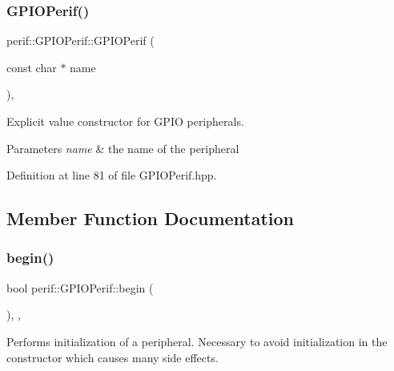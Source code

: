 \subsubsection{\texorpdfstring{GPIOPerif()}{GPIOPerif()}}
{\footnotesize\ttfamily perif\+::\+G\+P\+I\+O\+Perif\+::\+G\+P\+I\+O\+Perif (\begin{DoxyParamCaption}\item[{const char $\ast$}]{name }\end{DoxyParamCaption})\hspace{0.3cm}{\ttfamily [inline]}, {\ttfamily [explicit]}}

Explicit value constructor for G\+P\+IO peripherals.


\begin{DoxyParams}{Parameters}
{\em name} & the name of the peripheral \\
\hline
\end{DoxyParams}


Definition at line 81 of file G\+P\+I\+O\+Perif.\+hpp.


\begin{DoxyCode}{0}

\end{DoxyCode}


\subsection{Member Function Documentation}
\mbox{\label{classperif_1_1GPIOPerif_a3e94e58e8441b85256567c193164ea69}} 
\subsubsection{\texorpdfstring{begin()}{begin()}}
{\footnotesize\ttfamily bool perif\+::\+G\+P\+I\+O\+Perif\+::begin (\begin{DoxyParamCaption}{ }\end{DoxyParamCaption})\hspace{0.3cm}{\ttfamily [inline]}, {\ttfamily [override]}, {\ttfamily [virtual]}}

Performs initialization of a peripheral. Necessary to avoid initialization in the constructor which causes many side effects.

